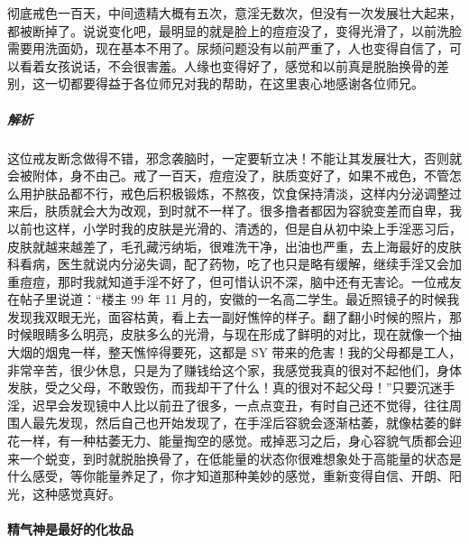 \begin{case}
    彻底戒色一百天，中间遗精大概有五次，意淫无数次，但没有一次发展壮大起来，都被断掉了。说说变化吧，最明显的就是脸上的痘痘没了，变得光滑了，以前洗脸需要用洗面奶，现在基本不用了。尿频问题没有以前严重了，人也变得自信了，可以看着女孩说话，不会很害羞。人缘也变得好了，感觉和以前真是脱胎换骨的差别，这一切都要得益于各位师兄对我的帮助，在这里衷心地感谢各位师兄。
    \subparagraph{解析} 这位戒友断念做得不错，邪念袭脑时，一定要斩立决！不能让其发展壮大，否则就会被附体，身不由己。戒了一百天，痘痘没了，肤质变好了，如果不戒色，不管怎么用护肤品都不行，戒色后积极锻炼，不熬夜，饮食保持清淡，这样内分泌调整过来后，肤质就会大为改观，到时就不一样了。很多撸者都因为容貌变差而自卑，我以前也这样，小学时我的皮肤是光滑的、清透的，但是自从初中染上手淫恶习后，皮肤就越来越差了，毛孔藏污纳垢，很难洗干净，出油也严重，去上海最好的皮肤科看病，医生就说内分泌失调，配了药物，吃了也只是略有缓解，继续手淫又会加重痘痘，那时我就知道手淫不好了，但可惜认识不深，脑中还有无害论。一位戒友在帖子里说道：“楼主 99 年 11 月的，安徽的一名高二学生。最近照镜子的时候我发现我双眼无光，面容枯黄，看上去一副好憔悴的样子。翻了翻小时候的照片，那时候眼睛多么明亮，皮肤多么的光滑，与现在形成了鲜明的对比，现在就像一个抽大烟的烟鬼一样，整天憔悴得要死，这都是 SY 带来的危害！我的父母都是工人，非常辛苦，很少休息，只是为了赚钱给这个家，我感觉我真的很对不起他们，身体发肤，受之父母，不敢毁伤，而我却干了什么！真的很对不起父母！”只要沉迷手淫，迟早会发现镜中人比以前丑了很多，一点点变丑，有时自己还不觉得，往往周围人最先发现，然后自己也开始发现了，在手淫后容貌会逐渐枯萎，就像枯萎的鲜花一样，有一种枯萎无力、能量掏空的感觉。戒掉恶习之后，身心容貌气质都会迎来一个蜕变，到时就脱胎换骨了，在低能量的状态你很难想象处于高能量的状态是什么感受，等你能量养足了，你才知道那种美妙的感觉，重新变得自信、开朗、阳光，这种感觉真好。
\end{case}

\paragraph{精气神是最好的化妆品}

